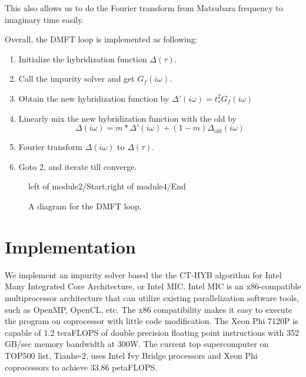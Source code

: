 This also allows us to do the Fourier transform from Matsubara frequency to imaginary
time easily. 

Overall, the DMFT loop is implemented as following:
\begin{enumerate}
\item Initialize the hybridization function $\Delta(\tau)$.
\item Call the impurity solver and get $G_f(i\omega)$.
\item Obtain the new hybridization function by $\Delta'(i\omega)=t_*^2G_f(i\omega)$
\item Linearly mix the new hybridization function with the old 
  by 
  \begin{equation}
    \label{eq:7}
    \Delta(i\omega) = m * \Delta'(i\omega)+ (1-m) \Delta_\mathrm{old}(i\omega)    
  \end{equation}
\item Fourier transform $\Delta(i\omega)$ to $\Delta(\tau)$.
\item Goto 2, and iterate till converge.

\end{enumerate}

\begin{figure}
  \centering
{}
{left of module2/Start,right of module4/End}
  \caption{A diagram for the DMFT loop.}
\end{figure}

\section{Implementation}
\label{ssec:hyb-implementation}
We implement an impurity solver based the the CT-HYB algorithm for 
Intel Many Integrated Core Architecture, or Intel MIC. Intel MIC is an 
x86-compatible multiprocessor architecture that can utilize existing 
parallelization software tools, such as OpenMP, OpenCL, etc. The x86 
compatibility makes it easy to execute the program on coprocessor with little
code modification. The Xeon Phi 7120P is capable of 1.2 teraFLOPS of double 
precision floating point instructions with 352 GB/sec memory bandwidth at 300W.
The current top supercomputer on TOP500 list, Tianhe-2, uses Intel Ivy Bridge
processors and Xeon Phi coprocessors to achieve 33.86 petaFLOPS.

